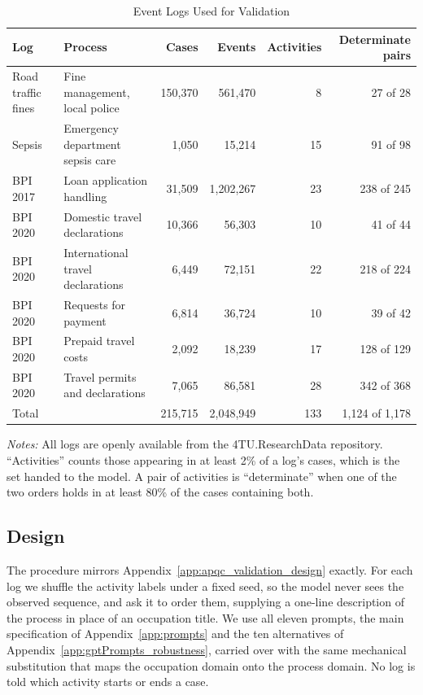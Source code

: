 \begin{table}[h!]
    \caption{Event Logs Used for Validation}
    \label{tab:eventlog_overview}
    \begin{center}
    \small
    \begin{tabular}{llrrrr}
    \toprule
    Log & Process & Cases & Events & Activities & Determinate pairs \\
    \midrule
    Road traffic fines & Fine management, local police & 150,370 & 561,470 & 8 & 27 of 28 \\
    Sepsis & Emergency department sepsis care & 1,050 & 15,214 & 15 & 91 of 98 \\
    BPI 2017 & Loan application handling & 31,509 & 1,202,267 & 23 & 238 of 245 \\
    BPI 2020 & Domestic travel declarations & 10,366 & 56,303 & 10 & 41 of 44 \\
    BPI 2020 & International travel declarations & 6,449 & 72,151 & 22 & 218 of 224 \\
    BPI 2020 & Requests for payment & 6,814 & 36,724 & 10 & 39 of 42 \\
    BPI 2020 & Prepaid travel costs & 2,092 & 18,239 & 17 & 128 of 129 \\
    BPI 2020 & Travel permits and declarations & 7,065 & 86,581 & 28 & 342 of 368 \\
    \midrule
    Total & & 215,715 & 2,048,949 & 133 & 1,124 of 1,178 \\
    \bottomrule
    \end{tabular}
    \end{center}
    \raggedright \footnotesize{\emph{Notes:}} All logs are openly available from the 4TU.ResearchData repository.
    ``Activities'' counts those appearing in at least 2\% of a log's cases, which is the set handed to the model.
    A pair of activities is ``determinate'' when one of the two orders holds in at least 80\% of the cases containing both.
\end{table}

\subsection{Design}
\label{app:eventlog_design}

The procedure mirrors Appendix~\ref{app:apqc_validation_design} exactly.
For each log we shuffle the activity labels under a fixed seed, so the model never sees the observed
sequence, and ask it to order them, supplying a one-line description of the process in place of an
occupation title.
We use all eleven prompts, the main specification of Appendix~\ref{app:prompts} and the ten alternatives of
Appendix~\ref{app:gptPrompts_robustness}, carried over with the same mechanical substitution that maps the
occupation domain onto the process domain.
No log is told which activity starts or ends a case.

